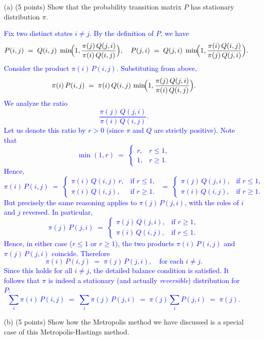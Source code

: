 \documentclass{article}
\begin{document}
\begin{itemize}

    \item[(a)] (5 points) Show that the probability transition matrix $P$ has stationary distribution $\pi$. 

    \textcolor{blue}{Fix two distinct states $i \neq j$. By the definition of $P$, we have
\[
  P(i,j)
  \;=\;
  Q(i,j)\;\min\!\Bigl(1,\frac{\pi(j)\,Q(j,i)}{\pi(i)\,Q(i,j)}\Bigr),
  \quad
  P(j,i)
  \;=\;
  Q(j,i)\;\min\!\Bigl(1,\frac{\pi(i)\,Q(i,j)}{\pi(j)\,Q(j,i)}\Bigr).
\]
Consider the product $\pi(i)\,P(i,j)$. Substituting from above,
\[
  \pi(i)\,P(i,j)
  \;=\;
  \pi(i)\,Q(i,j)\,\min\!\Bigl(1,\frac{\pi(j)\,Q(j,i)}{\pi(i)\,Q(i,j)}\Bigr).
\]
We analyze the ratio
\[
  \frac{\pi(j)\,Q(j,i)}{\pi(i)\,Q(i,j)}.
\]
Let us denote this ratio by $r > 0$ (since $\pi$ and $Q$ are strictly positive). 
Note that
\[
  \min(1,r) \;=\;
  \begin{cases}
  r, & r \le 1,\\
  1, & r \ge 1.
  \end{cases}
\]
Hence,
\[
  \pi(i)\,P(i,j)
  \;=\;
  \begin{cases}
  \pi(i)\,Q(i,j)\,r, & \text{if } r \le 1,\\[3pt]
  \pi(i)\,Q(i,j), & \text{if } r \ge 1.
  \end{cases}
  \;=\;
  \begin{cases}
  \pi(j)\,Q(j,i), & \text{if } r \le 1,\\[3pt]
  \pi(i)\,Q(i,j), & \text{if } r \ge 1.
  \end{cases}
\]
But precisely the same reasoning applies to $\pi(j)\,P(j,i)$, with the roles of $i$ and $j$ reversed. In particular,
\[
  \pi(j)\,P(j,i)
  \;=\;
  \begin{cases}
  \pi(j)\,Q(j,i), & \text{if } r \ge 1,\\[3pt]
  \pi(i)\,Q(i,j), & \text{if } r \le 1.
  \end{cases}
\]
Hence, in either case ($r\le 1$ or $r\ge 1$), the two products $\pi(i)\,P(i,j)$ and $\pi(j)\,P(j,i)$ coincide. Therefore
\[
  \pi(i)\,P(i,j) \;=\; \pi(j)\,P(j,i),
  \quad\text{for each }i\neq j.
\]
Since this holds for all $i \neq j$, the detailed balance condition is satisfied. 
It follows that $\pi$ is indeed a stationary (and actually \emph{reversible}) distribution for $P$:
\[
  \sum_{i}\pi(i)\,P(i,j) 
  \;=\; \sum_{i}\pi(j)\,P(j,i)
  \;=\;
  \pi(j)\sum_{i}P(j,i)
  \;=\;
  \pi(j).
\]}

    \item[(b)] (5 points) Show how the Metropolis method we have discussed is a special case of this Metropolis-Hastings method.


\end{itemize}
\end{document}
